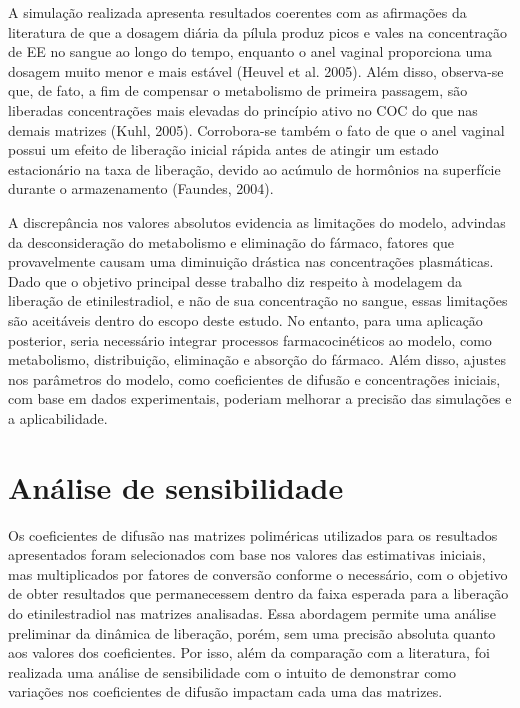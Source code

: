 A simulação realizada apresenta resultados coerentes com as afirmações da literatura de que a dosagem diária da pílula produz picos e vales na concentração de EE no sangue ao longo do tempo, enquanto o anel vaginal proporciona uma dosagem muito menor e mais estável (Heuvel et al. 2005). Além disso, observa-se que, de fato, a fim de compensar o metabolismo de primeira passagem, são liberadas concentrações mais elevadas do princípio ativo no COC do que nas demais matrizes (Kuhl, 2005). Corrobora-se também o fato de que o anel vaginal possui um efeito de liberação inicial rápida antes de atingir um estado estacionário na taxa de liberação, devido ao acúmulo de hormônios na superfície durante o armazenamento (Faundes, 2004).

A discrepância nos valores absolutos evidencia as limitações do modelo, advindas da desconsideração do metabolismo e eliminação do fármaco, fatores que provavelmente causam uma diminuição drástica nas concentrações plasmáticas. Dado que o objetivo principal desse trabalho diz respeito à modelagem da liberação de etinilestradiol, e não de sua concentração no sangue, essas limitações são aceitáveis dentro do escopo deste estudo. No entanto, para uma aplicação posterior, seria necessário integrar processos farmacocinéticos ao modelo, como metabolismo, distribuição, eliminação e absorção do fármaco. Além disso, ajustes nos parâmetros do modelo, como coeficientes de difusão e concentrações iniciais, com base em dados experimentais, poderiam melhorar a precisão das simulações e a aplicabilidade. 

\section{Análise de sensibilidade}

Os coeficientes de difusão nas matrizes poliméricas utilizados para os resultados apresentados foram selecionados com base nos valores das estimativas iniciais, mas multiplicados por fatores de conversão conforme o necessário, com o objetivo de obter resultados que permanecessem dentro da faixa esperada para a liberação do etinilestradiol nas matrizes analisadas. Essa abordagem permite uma análise preliminar da dinâmica de liberação, porém, sem uma precisão absoluta quanto aos valores dos coeficientes. Por isso, além da comparação com a literatura, foi realizada uma análise de sensibilidade com o intuito de demonstrar como variações nos coeficientes de difusão impactam cada uma das matrizes.

